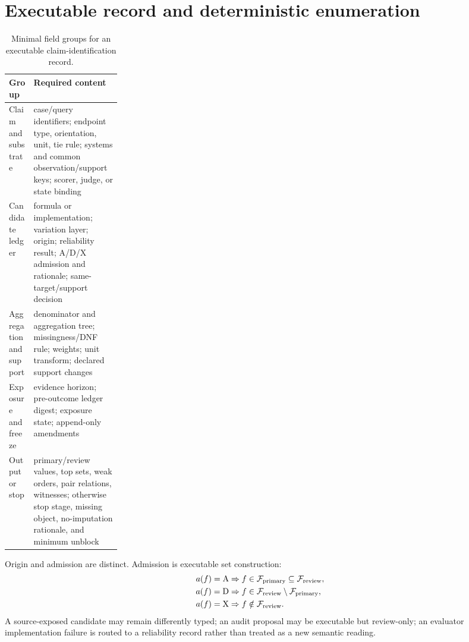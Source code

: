 \section{Executable record and deterministic enumeration}
\label{app:executable-contract}

\begin{table}[ht]
\centering
\caption{Minimal field groups for an executable claim-identification record.}
\label{tab:reviewer-input-schema}
\footnotesize
\begin{tabularx}{\linewidth}{@{}p{0.22\linewidth}Y@{}}
\toprule Group & Required content \\
\midrule
Claim and substrate & case/query identifiers; endpoint type, orientation, unit, tie rule; systems and common observation/support keys; scorer, judge, or state binding \\
Candidate ledger & formula or implementation; variation layer; origin; reliability result; A/D/X admission and rationale; same-target/support decision \\
Aggregation and support & denominator and aggregation tree; missingness/DNF rule; weights; unit transform; declared support changes \\
Exposure and freeze & evidence horizon; pre-outcome ledger digest; exposure state; append-only amendments \\
Output or stop & primary/review values, top sets, weak orders, pair relations, witnesses; otherwise stop stage, missing object, no-imputation rationale, and minimum unblock \\
\bottomrule
\end{tabularx}
\end{table}

Origin and admission are distinct.  Admission is executable set construction:
\begin{equation*}
\begin{aligned}
a(f)=\mathrm A&\Rightarrow f\in\mathcal F_{\mathrm{primary}}\subseteq\mathcal F_{\mathrm{review}},\\
a(f)=\mathrm D&\Rightarrow f\in\mathcal F_{\mathrm{review}}\setminus\mathcal F_{\mathrm{primary}},\\
a(f)=\mathrm X&\Rightarrow f\notin\mathcal F_{\mathrm{review}}.
\end{aligned}
\end{equation*}
A source-exposed candidate may remain differently typed; an audit proposal may be executable but review-only; an evaluator implementation failure is routed to a reliability record rather than treated as a new semantic reading.

